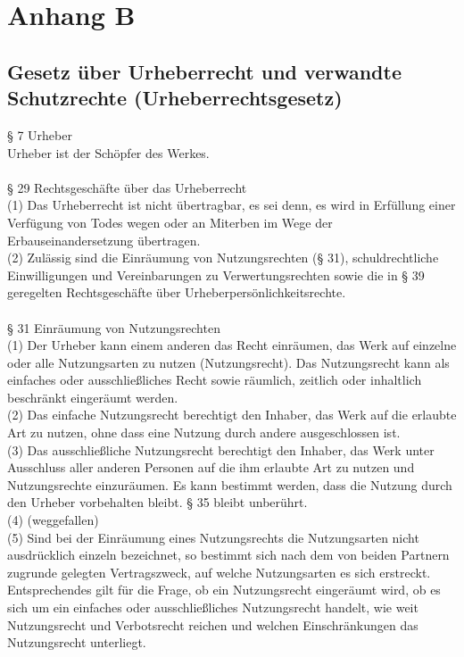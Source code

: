 \documentclass[12pt,titlepage]{report}
\begin{document}
\newpage
\chapter*{Anhang B}
\section*{Gesetz über Urheberrecht und verwandte Schutzrechte (Urheberrechtsgesetz)}

§ 7 Urheber\\
Urheber ist der Schöpfer des Werkes.\\\\

§ 29 Rechtsgeschäfte über das Urheberrecht\\
(1) Das Urheberrecht ist nicht übertragbar, es sei denn, es wird in Erfüllung einer Verfügung von Todes wegen oder an Miterben im Wege der Erbauseinandersetzung übertragen.\\
(2) Zulässig sind die Einräumung von Nutzungsrechten (§ 31), schuldrechtliche Einwilligungen und Vereinbarungen zu Verwertungsrechten sowie die in § 39 geregelten Rechtsgeschäfte über Urheberpersönlichkeitsrechte.\\\\

§ 31 Einräumung von Nutzungsrechten\\
(1) Der Urheber kann einem anderen das Recht einräumen, das Werk auf einzelne oder alle Nutzungsarten zu nutzen (Nutzungsrecht). Das Nutzungsrecht kann als einfaches oder ausschließliches Recht sowie räumlich, zeitlich oder inhaltlich beschränkt eingeräumt werden.\\
(2) Das einfache Nutzungsrecht berechtigt den Inhaber, das Werk auf die erlaubte Art zu nutzen, ohne dass eine Nutzung durch andere ausgeschlossen ist.\\
(3) Das ausschließliche Nutzungsrecht berechtigt den Inhaber, das Werk unter Ausschluss aller anderen Personen auf die ihm erlaubte Art zu nutzen und Nutzungsrechte einzuräumen. Es kann bestimmt werden, dass die Nutzung durch den Urheber vorbehalten bleibt. § 35 bleibt unberührt.\\
(4) (weggefallen)\\
(5) Sind bei der Einräumung eines Nutzungsrechts die Nutzungsarten nicht ausdrücklich einzeln bezeichnet, so bestimmt sich nach dem von beiden Partnern zugrunde gelegten Vertragszweck, auf welche Nutzungsarten es sich erstreckt. Entsprechendes gilt für die Frage, ob ein Nutzungsrecht eingeräumt wird, ob es sich um ein einfaches oder ausschließliches Nutzungsrecht handelt, wie weit Nutzungsrecht und Verbotsrecht reichen und welchen Einschränkungen das Nutzungsrecht unterliegt.\\\\
\end{document}
